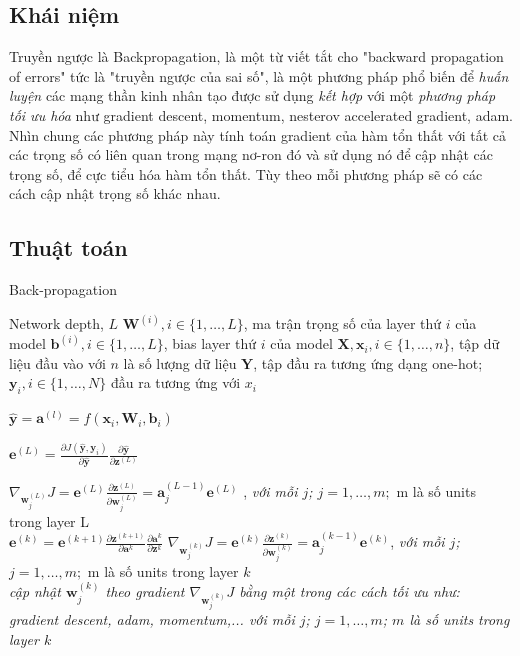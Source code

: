 \subsection{ Khái niệm}

Truyền ngược là Backpropagation, là một từ viết tắt cho "backward propagation of errors" tức là "truyền ngược của sai số", là một phương pháp phổ biến để \textit{huấn luyện} các mạng thần kinh nhân tạo được sử dụng \textit{kết hợp} với một \textit{phương pháp tối ưu hóa} như gradient descent, momentum, nesterov accelerated gradient, adam. Nhìn chung các phương pháp này tính toán gradient của hàm tổn thất với tất cả các trọng số có liên quan trong mạng nơ-ron đó và sử dụng nó để cập nhật các trọng số, để cực tiểu hóa hàm tổn thất. Tùy theo mỗi phương pháp sẽ có các cách cập nhật trọng số khác nhau.
\subsection{Thuật toán}
\begin{algorithm}[H]
\caption{Back-propagation}
\label{al:backward}
\begin{algorithmic}[1]
\REQUIRE Network depth, $L$
\REQUIRE $\textbf{W}^{(i)}, i \in \{1,\ldots,L \}$, ma trận trọng số của layer thứ $i$ của model
\REQUIRE $\textbf{b}^{(i)}, i \in \{1,\ldots,L \}$, bias layer thứ $i$ của model	
\REQUIRE $\textbf{X}, \textbf{x}_i, i \in \{1,\ldots,n \} $, tập dữ liệu đầu vào với $n$ là số lượng dữ liệu
\REQUIRE $\textbf{Y}$, tập đầu ra tương ứng dạng one-hot; $\textbf{y}_i, i\in \{1,\ldots,N\}$ đầu ra tương ứng với $x_i$

\STATE $\widehat{\textbf{y}} = \textbf{a}^{(l)}= f(\textbf{x}_{i},\textbf{W}_{i},\textbf{b}_{i})$

\STATE	$\textbf{e}^{(L)} = \frac{\partial J(\widehat{\textbf{y}},\textbf{y}_{i}) }{\partial \widehat{\textbf{y}}} \frac{\partial  \widehat{\textbf{y}}}{\partial \textbf{z}^{(L)}}$

\STATE $\nabla_{\textbf{w}^{(L)}_j}J = \textbf{e}^{(L)} \frac{\partial \textbf{z}^{(L)}}{\partial \textbf{w}^{(L)}_j} = \textbf{a}^{(L-1)}_{j}\textbf{e}^{(L)}$ , \textit{với mỗi $j$; $j =1,\ldots, m;$} m là số units trong layer L \\
		\STATE $\textbf{e}^{(k)}= \textbf{e}^{(k+1)} \frac{\partial  {\textbf{z}^{(k+1)}}}{\partial \textbf{a}^{k}} \frac{\partial\textbf{a}^{k}}{\partial\textbf{z}^{k}} $
		\STATE $\nabla_{\textbf{w}^{(k)}_{j}}J =\textbf{e}^{(k)} \frac{\partial \textbf{z}^{(k)}}{\partial \textbf{w}^{(k)}_j} = \textbf{a}^{(k-1)}_{j}\textbf{e}^{(k)}$,  \textit{với mỗi $j$; $j =1,\ldots, m;$} m là số units trong layer $k$ \\
		
	\ENDFOR
	\STATE 	\textit{cập nhật $\textbf{w}^{(k)}_j$ theo gradient $\nabla_{\textbf{w}^{(k)}_j}J$ bằng một trong các cách tối ưu như: gradient descent, adam, momentum,... với mỗi $j$; $j =1,\ldots, m$; $m$ là số units trong layer $k$}
	
	\ENDFOR
\ENDFOR
\end{algorithmic}
\end{algorithm}


